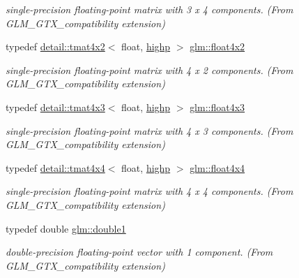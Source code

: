 \begin{DoxyCompactItemize}
\begin{DoxyCompactList}\small\item\em single-\/precision floating-\/point matrix with 3 x 4 components. (From G\+L\+M\+\_\+\+G\+T\+X\+\_\+compatibility extension) \end{DoxyCompactList}\item 
typedef \hyperlink{structglm_1_1detail_1_1tmat4x2}{detail\+::tmat4x2}$<$ float, \hyperlink{namespaceglm_a0f04f086094c747d227af4425893f545ac6f7eab42eacbb10d59a58e95e362074}{highp} $>$ \hyperlink{group__gtx__compatibility_gab805aa2d6bbd5edddf78bd2e9322e6c7}{glm\+::float4x2}
\begin{DoxyCompactList}\small\item\em single-\/precision floating-\/point matrix with 4 x 2 components. (From G\+L\+M\+\_\+\+G\+T\+X\+\_\+compatibility extension) \end{DoxyCompactList}\item 
typedef \hyperlink{structglm_1_1detail_1_1tmat4x3}{detail\+::tmat4x3}$<$ float, \hyperlink{namespaceglm_a0f04f086094c747d227af4425893f545ac6f7eab42eacbb10d59a58e95e362074}{highp} $>$ \hyperlink{group__gtx__compatibility_ga72398a5d715031923beca8907c52f5d6}{glm\+::float4x3}
\begin{DoxyCompactList}\small\item\em single-\/precision floating-\/point matrix with 4 x 3 components. (From G\+L\+M\+\_\+\+G\+T\+X\+\_\+compatibility extension) \end{DoxyCompactList}\item 
typedef \hyperlink{structglm_1_1detail_1_1tmat4x4}{detail\+::tmat4x4}$<$ float, \hyperlink{namespaceglm_a0f04f086094c747d227af4425893f545ac6f7eab42eacbb10d59a58e95e362074}{highp} $>$ \hyperlink{group__gtx__compatibility_ga1f48a19e35b3640cf3d509041f7a800b}{glm\+::float4x4}
\begin{DoxyCompactList}\small\item\em single-\/precision floating-\/point matrix with 4 x 4 components. (From G\+L\+M\+\_\+\+G\+T\+X\+\_\+compatibility extension) \end{DoxyCompactList}\item 
typedef double \hyperlink{group__gtx__compatibility_gab8b88350212cea916857cb2f49b8a29f}{glm\+::double1}
\begin{DoxyCompactList}\small\item\em double-\/precision floating-\/point vector with 1 component. (From G\+L\+M\+\_\+\+G\+T\+X\+\_\+compatibility extension) \end{DoxyCompactList}\item 

\end{DoxyCompactItemize}

